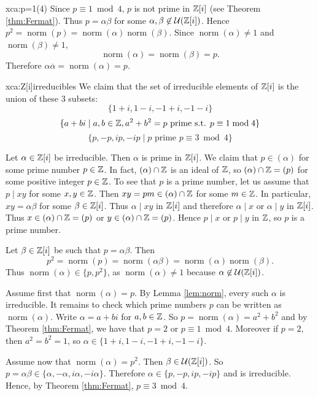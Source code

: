 \begin{sol}{xca:p=1(4)}
    Since $p\equiv1\bmod4$, 
    $p$ is not prime in $\mathbb{Z}[i]$ (see Theorem \ref{thm:Fermat}). 
    Thus $p=\alpha\beta$ for some $\alpha,\beta\not\in\mathcal{U}(\mathbb{Z}[i])$. Hence $p^2=\operatorname{norm}(p)=\operatorname{norm}(\alpha)\operatorname{norm}(\beta)$. Since 
    $\operatorname{norm}(\alpha)\ne 1$ and $\operatorname{norm}(\beta)\ne 1$, 
    \[ 
    \operatorname{norm}(\alpha)=\operatorname{norm}(\beta)=p.
    \]
    Therefore $\alpha\overline{\alpha}=\operatorname{norm}(\alpha)=p$. 
\end{sol}

\begin{sol}{xca:Z[i]irreducibles}
    We claim that the set of irreducible
    elements of $\mathbb{Z}[i]$ 
    is the union of these 3 subsets:
    \[
    \{1+i,1-i,-1+i,-1-i\}
    \]
    \[
    \{a+bi\mid a,b\in \mathbb{Z}, a^2+b^2=p \text{ prime
    s.t. }p\equiv1\bmod 4\}
    \]
    \[
    \{p,-p,ip,-ip\mid p \text{ prime }p\equiv3\bmod 4\}
    \]
    
    Let $\alpha\in\mathbb{Z}[i]$ be irreducible. Then $\alpha$ is
    prime in $\mathbb{Z}[i]$. We claim that $p\in (\alpha)$ for some
    prime number $p\in\mathbb{Z}$. In fact, 
    $(\alpha)\cap\mathbb{Z}$ is an ideal of $\mathbb{Z}$, so 
    $(\alpha)\cap\mathbb{Z}=(p)$ for some positive integer $p\in\mathbb{Z}$. 
    To see that $p$ is a prime number, let 
    us assume that $p\mid xy$ for some $x,y\in\mathbb{Z}$. Then 
    $xy=pm\in (\alpha)\cap\mathbb{Z}$ for some $m\in\mathbb{Z}$. In particular, 
    $xy=\alpha\beta$ for some $\beta\in\mathbb{Z}[i]$. Thus $\alpha\mid xy$
    in $\mathbb{Z}[i]$ and therefore 
    $\alpha\mid x$ or $\alpha\mid y$ in $\mathbb{Z}[i]$. Thus 
    $x\in (\alpha)\cap\mathbb{Z}=(p)$ or $y\in(\alpha)\cap\mathbb{Z}=(p)$. Hence
    $p\mid x$ or $p\mid y$ in $\mathbb{Z}$, so $p$ is a prime number. 

    Let $\beta\in\mathbb{Z}[i]$ be such that $p=\alpha\beta$. 
    Then 
    \[
    p^2=\operatorname{norm}(p)=\operatorname{norm}(\alpha\beta)=\operatorname{norm}(\alpha)\operatorname{norm}(\beta).
    \]
    Thus $\operatorname{norm}(\alpha)\in\{p,p^2\}$, 
    as $\operatorname{norm}(\alpha)\ne1$ because $\alpha\not\in\mathcal{U}(\mathbb{Z}[i])$. 
    
    Assume first that $\operatorname{norm}(\alpha)=p$. By Lemma \ref{lem:norm},
    every such $\alpha$ is irreducible. It remains to check which prime numbers $p$ can be written as $\operatorname{norm}(\alpha)$.
    Write $\alpha=a+bi$ 
    for $a,b\in\mathbb{Z}$. So $p=\operatorname{norm}(\alpha)=a^2+b^2$ 
    and by Theorem \ref{thm:Fermat}, we have that $p=2$
    or $p\equiv1\bmod 4$.
    Moreover if $p=2$, then $a^2=b^2=1$, so $\alpha\in\{1+i,1-i,-1+i,-1-i\}$.
    
    Assume now that $\operatorname{norm}(\alpha)=p^2$. Then $\beta\in\mathcal{U}(\mathbb{Z}[i])$.
    So $p=\alpha\beta\in\{\alpha,-\alpha, i\alpha,-i\alpha\}$.
    Therefore $\alpha\in\{p,-p,ip,-ip\}$ and is irreducible. 
    Hence, by Theorem \ref{thm:Fermat}, $p\equiv3\bmod 4$.
\end{sol}   


